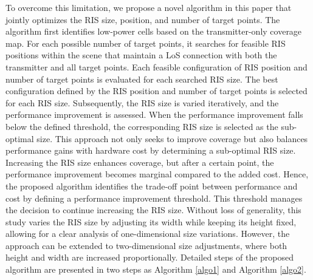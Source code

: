 \documentclass{IEEEoj}
\begin{document}
To overcome this limitation, we propose a novel algorithm in this paper that jointly optimizes the RIS size, position, and number of target points. The algorithm first identifies low-power cells based on the transmitter-only coverage map. For each possible number of target points, it searches for feasible RIS positions within the scene that maintain a LoS connection with both the transmitter and all target points. Each feasible configuration of RIS position and number of target points is evaluated for each searched RIS size. The best configuration defined by the RIS position and number of target points is selected for each RIS size. Subsequently, the RIS size is varied iteratively, and the performance improvement is assessed. When the performance improvement falls below the defined threshold, the corresponding RIS size is selected as the sub-optimal size. This approach not only seeks to improve coverage but also balances performance gains with hardware cost by determining a sub-optimal RIS size. Increasing the RIS size enhances coverage, but after a certain point, the performance improvement becomes marginal compared to the added cost. Hence, the proposed algorithm identifies the trade-off point between performance and cost by defining a performance improvement threshold. This threshold manages the decision to continue increasing the RIS size. Without loss of generality, this study varies the RIS size by adjusting its width while keeping its height fixed, allowing for a clear analysis of one-dimensional size variations. However, the approach can be extended to two-dimensional size adjustments, where both height and width are increased proportionally. Detailed steps of the proposed algorithm are presented in two steps as Algorithm \ref{algo1} and Algorithm \ref{algo2}.
\end{document}
